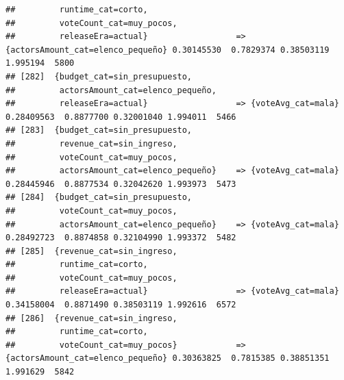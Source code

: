 \documentclass[
]{article}
\begin{document}
\begin{verbatim}
##         runtime_cat=corto,                                                                                                      
##         voteCount_cat=muy_pocos,                                                                                                
##         releaseEra=actual}                  => {actorsAmount_cat=elenco_pequeño} 0.30145530  0.7829374 0.38503119 1.995194  5800
## [282]  {budget_cat=sin_presupuesto,                                                                                             
##         actorsAmount_cat=elenco_pequeño,                                                                                        
##         releaseEra=actual}                  => {voteAvg_cat=mala}                0.28409563  0.8877700 0.32001040 1.994011  5466
## [283]  {budget_cat=sin_presupuesto,                                                                                             
##         revenue_cat=sin_ingreso,                                                                                                
##         voteCount_cat=muy_pocos,                                                                                                
##         actorsAmount_cat=elenco_pequeño}    => {voteAvg_cat=mala}                0.28445946  0.8877534 0.32042620 1.993973  5473
## [284]  {budget_cat=sin_presupuesto,                                                                                             
##         voteCount_cat=muy_pocos,                                                                                                
##         actorsAmount_cat=elenco_pequeño}    => {voteAvg_cat=mala}                0.28492723  0.8874858 0.32104990 1.993372  5482
## [285]  {revenue_cat=sin_ingreso,                                                                                                
##         runtime_cat=corto,                                                                                                      
##         voteCount_cat=muy_pocos,                                                                                                
##         releaseEra=actual}                  => {voteAvg_cat=mala}                0.34158004  0.8871490 0.38503119 1.992616  6572
## [286]  {revenue_cat=sin_ingreso,                                                                                                
##         runtime_cat=corto,                                                                                                      
##         voteCount_cat=muy_pocos}            => {actorsAmount_cat=elenco_pequeño} 0.30363825  0.7815385 0.38851351 1.991629  5842

\end{verbatim}
\end{document}
